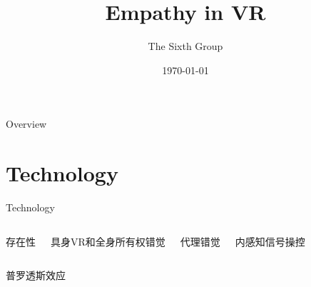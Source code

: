 \documentclass[aspectratio=169,xcolor=dvipsnames]{beamer}
\title{Empathy in VR}
\author{The Sixth Group}
\date{\today} %
\begin{document}
\begin{frame}
    \titlepage
\end{frame}

\begin{frame}{Overview}
    \tableofcontents
\end{frame}


\section{Technology}
\begin{frame}{Technology}
    \centering
    \vspace{-0.5cm}
    
    \begin{columns}[onlytextwidth,T]
        \begin{block}{\color{white!80!black}存在性 }
 
        \end{block}
        
        \vspace{0.3cm}
        
        \begin{alertblock}{\color{white!70!black}具身VR和全身所有权错觉}

   
        \end{alertblock}
        
        \begin{block}{\color{white!80!black}代理错觉 }

 
        \end{block}
        
        \vspace{0.3cm}
        
        \begin{alertblock}{\color{white!80!black}内感知信号操控}


        \end{alertblock}
    \end{columns}
    
    \vspace{0.5cm}
    
    \begin{block}{\color{white!80!black}普罗透斯效应}
 


\end{block}
\end{frame}
\end{document}
